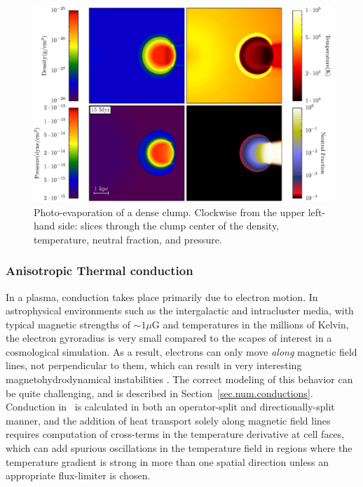 \begin{figure}
  \centering
  \includegraphics[width=1.0\textwidth]{figures/code-test-shadowing.eps}
  \caption{Photo-evaporation of a dense clump.  Clockwise from the
    upper left-hand side: slices through the clump center of the
    density, temperature, neutral fraction, and pressure.}
  \label{fig:shadowing}
\end{figure}





\subsubsection{Anisotropic Thermal conduction}
\label{sec.tests.conduct}

In a plasma, conduction takes place primarily due to electron motion.
In astrophysical environments such as the intergalactic and
intracluster media, with typical magnetic strengths of $\sim 1 \mu$G
and temperatures in the millions of Kelvin, the electron gyroradius is
very small compared to the scapes of interest in a cosmological
simulation.  As a result, electrons can only move \textit{along}
magnetic field lines, not perpendicular to them, which can result in
very interesting magnetohydrodynamical instabilities
\citep[e.g.,][]{2008ApJ...677L...9P,2008ApJ...688..905P}. 
 The correct modeling of this behavior can be quite challenging, and is described in 
Section~\ref{sec.num.conductions}.  Conduction in \enzo\ is calculated
in both an operator-split and directionally-split manner, and the
addition of heat transport solely along magnetic field lines requires
computation of cross-terms in the temperature derivative at cell
faces, which can add spurious oscillations in the temperature field in
regions where the temperature gradient is strong in more than one
spatial direction unless an appropriate flux-limiter \citep[such as that
of][]{1977JCoPh..23..263V} is chosen.

